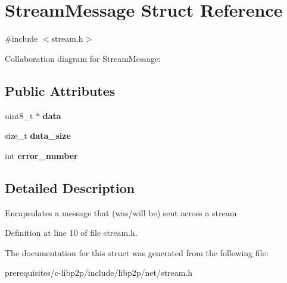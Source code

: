 \hypertarget{struct_stream_message}{}\section{Stream\+Message Struct Reference}
\label{struct_stream_message}


{\ttfamily \#include $<$stream.\+h$>$}



Collaboration diagram for Stream\+Message\+:
\subsection*{Public Attributes}
\begin{DoxyCompactItemize}
\item 
\mbox{\label{struct_stream_message_ad60856499933e76809d2cee60eede297}} 
uint8\+\_\+t $\ast$ {\bfseries data}
\item 
\mbox{\label{struct_stream_message_a94d15485a4fa11de76b564071e8e94a6}} 
size\+\_\+t {\bfseries data\+\_\+size}
\item 
\mbox{\label{struct_stream_message_a69fd3dd0b3224f7b4f87de166b5b09fd}} 
int {\bfseries error\+\_\+number}
\end{DoxyCompactItemize}


\subsection{Detailed Description}
Encapsulates a message that (was/will be) sent across a stream 

Definition at line 10 of file stream.\+h.



The documentation for this struct was generated from the following file\+:\begin{DoxyCompactItemize}
\item 
prerequisites/c-\/libp2p/include/libp2p/net/stream.\+h\end{DoxyCompactItemize}
